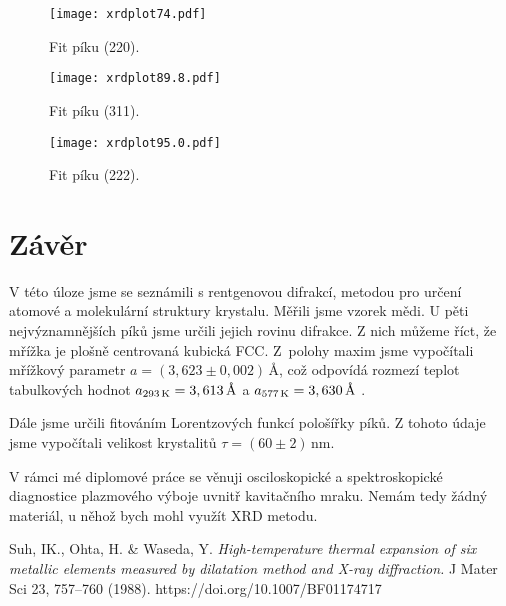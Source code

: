 \documentclass[a4paper,12pt]{article}
\begin{document}
\begin{figure}[h!]
\centering
\texttt{[image: xrdplot74.pdf]}
\caption{\centering Fit píku (220).}
\label{fig:74}
\end{figure}

\begin{figure}[h!]
\centering
\texttt{[image: xrdplot89.8.pdf]}
\caption{\centering Fit píku (311).}
\label{fig:90}
\end{figure}
	
\begin{figure}[h!]
	\centering
	\texttt{[image: xrdplot95.0.pdf]}
	\caption{\centering Fit píku (222).}
	\label{fig:95}
\end{figure}
\clearpage
\section{Závěr}\noindent
V této úloze jsme se seznámili s rentgenovou difrakcí, metodou pro určení 
atomové a molekulární struktury krystalu. Měřili jsme vzorek mědi. U pěti 
nejvýznamnějších píků jsme určili jejich rovinu difrakce. Z nich můžeme říct, 
že mřížka je plošně centrovaná kubická FCC. Z~polohy maxim jsme vypočítali 
mřížkový parametr $a = (3,623\pm0,002)\,\si{\angstrom}$, což odpovídá rozmezí 
teplot tabulkových hodnot $a_{\text{293\,\si{\kelvin}}} = 
3,613\,\si{\angstrom}$ a $a_{\text{577\,\si{\kelvin}}} = 3,630\,\si{\angstrom}$ 
\cite{cod}.

Dále jsme určili fitováním Lorentzových funkcí pološířky píků. Z tohoto údaje 
jsme vypočítali velikost krystalitů $\tau = (60 \pm 2)\,\si{\nano\meter}$.

V rámci mé diplomové práce se věnuji osciloskopické a spektroskopické 
diagnostice plaz\-mo\-vé\-ho výboje uvnitř kavitačního mraku. Nemám tedy žádný 
materiál, u něhož bych mohl využít XRD metodu.
	
\begin{thebibliography}{10}
	 Suh, IK., Ohta, H. \& Waseda, Y. \textit{High-temperature 
	thermal expansion of six metallic elements measured by dilatation method 
	and X-ray diffraction.} J Mater Sci 23, 757–760 (1988). 
	https://doi.org/10.1007/BF01174717
\end{thebibliography}
	
\end{document}
